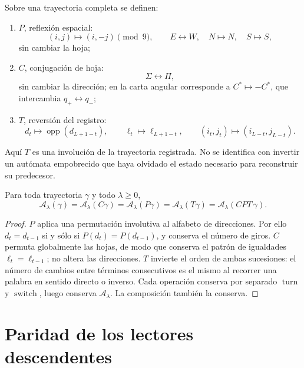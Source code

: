 \begin{definition}
\label{def:cpt-discreto-rutas-rev6}
Sobre una trayectoria completa se definen:
\begin{enumerate}
\item \(P\), reflexión espacial:
\[
 (i,j)\longmapsto(i,-j)\pmod9,
 \qquad E\leftrightarrow W,\quad N\mapsto N,\quad S\mapsto S,
\]
sin cambiar la hoja;
\item \(C\), conjugación de hoja:
\[
 \Sigma\leftrightarrow\Pi,
\]
sin cambiar la dirección; en la carta angular corresponde a
\(C^*\mapsto-C^*\), que intercambia \(q_+\leftrightarrow q_-\);
\item \(T\), reversión del registro:
\[
 d_t\longmapsto\operatorname{opp}(d_{L+1-t}),
 \qquad
 \ell_t\longmapsto\ell_{L+1-t},
 \qquad
 (i_t,j_t)\longmapsto(i_{L-t},j_{L-t}).
\]
\end{enumerate}
\end{definition}

Aquí \(T\) es una involución de la trayectoria registrada. No se identifica
con invertir un autómata empobrecido que haya olvidado el estado necesario
para reconstruir su predecesor.

\begin{theorem}
\label{thm:invariancia-cpt-discreta-rev6}
Para toda trayectoria \(\gamma\) y todo \(\lambda\geq0\),
\[
 \boxed{
 \mathcal A_\lambda(\gamma)
 =
 \mathcal A_\lambda(C\gamma)
 =
 \mathcal A_\lambda(P\gamma)
 =
 \mathcal A_\lambda(T\gamma)
 =
 \mathcal A_\lambda(CPT\,\gamma).}
\]
\end{theorem}

\begin{proof}
\(P\) aplica una permutación involutiva al alfabeto de direcciones. Por ello
\(d_t=d_{t-1}\) si y sólo si
\(P(d_t)=P(d_{t-1})\), y conserva el número de giros. \(C\) permuta
globalmente las hojas, de modo que conserva el patrón de igualdades
\(\ell_t=\ell_{t-1}\); no altera las direcciones. \(T\) invierte el orden de
ambas sucesiones: el número de cambios entre términos consecutivos es el
mismo al recorrer una palabra en sentido directo o inverso. Cada operación
conserva por separado \(\operatorname{turn}\) y
\(\operatorname{switch}\), luego conserva
\(\mathcal A_\lambda\). La composición también la conserva.
\end{proof}

\section{Paridad de los lectores descendentes}

